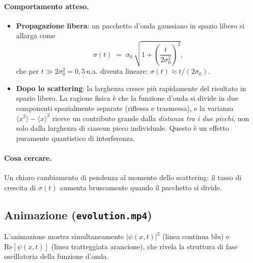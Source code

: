 \documentclass[12pt, a4paper]{article}
\begin{document}
\paragraph{Comportamento atteso.}
\begin{itemize}
  \item \textbf{Propagazione libera}: un pacchetto d'onda gaussiano
        in spazio libero si allarga come
        \begin{equation}
          \sigma(t) \;=\; \sigma_0\,\sqrt{1 +
          \left(\frac{t}{2\sigma_0^2}\right)^2},
          \label{eq:spreading}
        \end{equation}
        che per $t \gg 2\sigma_0^2 = 0{,}5$\,u.a. diventa lineare:
        $\sigma(t) \approx t/(2\sigma_0)$.

  \item \textbf{Dopo lo scattering}: la larghezza cresce più
        rapidamente del risultato in spazio libero.  La ragione fisica
        è che la funzione d'onda si divide in due componenti
        spazialmente separate (riflessa e trasmessa), e la varianza
        $\langle x^2\rangle - \langle x\rangle^2$ riceve un contributo
        grande dalla \emph{distanza tra i due picchi}, non solo dalla
        larghezza di ciascun picco individuale.  Questo è un effetto
        puramente quantistico di interferenza.
\end{itemize}

\paragraph{Cosa cercare.}
Un chiaro cambiamento di pendenza al momento dello scattering: il
tasso di crescita di $\sigma(t)$ aumenta bruscamente quando il
pacchetto si divide.

\subsection{Animazione (\texttt{evolution.mp4})}

L'animazione mostra simultaneamente $|\psi(x,t)|^2$ (linea continua
blu) e $\mathrm{Re}[\psi(x,t)]$ (linea tratteggiata arancione), che
rivela la struttura di fase oscillatoria della funzione d'onda.
\end{document}
